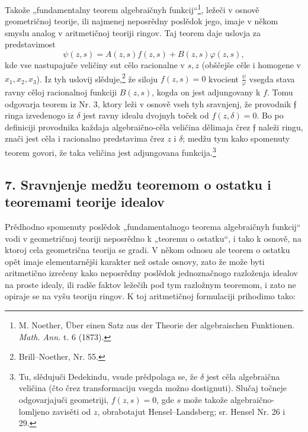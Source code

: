 \documentclass[11pt]{article}
\providecommand{\frf}{\mathfrak f}
\begin{document}
Takože „fundamentalny teorem algebraičnyh funkcij“\footnote{M. Noether, Über einen Satz aus der Theorie der algebraischen Funktionen. \emph{Math. Ann.} t. 6 (1873).}, ležeči v osnově geometričnoj teorije, ili najmenej neposrědny poslědok jego, imaje v někom smyslu analog v aritmetičnoj teoriji ringov. Taj teorem daje uslovja za predstavimost
\[
\psi(z,s)=A(z,s)f(z,s)+B(z,s)\varphi(z,s),
\]
kde vse nastupajuče veličiny sut cělo racionalne v \(s,z\) (obščejše cěle i homogene v \(x_1,x_2,x_3\)). Iz tyh uslovij slěduje,\footnote{Brill--Noether, Nr. 55.} že siloju \(f(z,s)=0\) kvocient \(\frac{\psi}{\varphi}\) vsegda stava ravny cěloj racionalnoj funkciji \(B(z,s)\), kogda on jest adjungovany k \(f\). Tomu odgovarja teorem iz Nr. 3, ktory leži v osnově vseh tyh sravnjenj, že provodnik \(\frf\) ringa izvedenogo iz \(\delta\) jest ravny idealu dvojnyh toček od \(f(z,\delta)=0\). Bo po definiciji provodnika každaja algebraično-cěla veličina dělimaja črez \(\frf\) naleži ringu, znači jest cěla i racionalno predstavima črez \(z\) i \(\delta\); medžu tym kako spomenuty teorem govori, že taka veličina jest adjungovana funkcija.\footnote{Tu, slědujuči Dedekindu, vsude prědpolaga se, že \(\delta\) jest cěla algebraična veličina (čto črez transformaciju vsegda možno dostignuti). Slučaj točneje odgovarjajuči geometriji, \(f(z,s)=0\), gde \(s\) može takože algebraično-lomljeno zavisěti od \(z\), obrabotajut Hensel--Landsberg; sr. Hensel Nr. 26 i 29.}

\subsection*{7. Sravnjenje medžu teoremom o ostatku i teoremami teorije idealov}
Prědhodno spomenuty poslědok „fundamentalnogo teorema algebraičnyh funkcij“ vodi v geometričnoj teoriji neposrědno k „teoremu o ostatku“, i tako k osnově, na ktoroj cela geometrična teorija se gradi. V někom odnosu ale teorem o ostatku opět imaje elementarnějši karakter než ostale osnovy, zato že može byti aritmetično izrečeny kako neposrědny poslědok jednoznačnogo razloženja idealov na proste idealy, ili radše faktov ležečih pod tym razložnym teoremom, i zato ne opiraje se na vyšu teoriju ringov. K toj aritmetičnoj formulaciji prihodimo tako:
\end{document}
